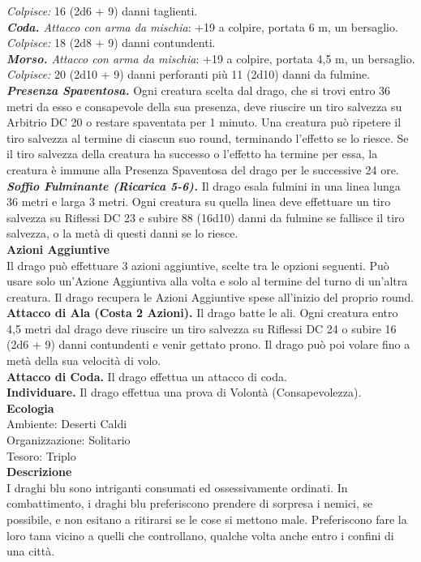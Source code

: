 \begin{multicols}{2}
\emph{Colpisce:} 16 (2d6 + 9) danni taglienti.\\
\emph{\textbf{Coda.} Attacco con arma da mischia}: +19 a colpire, portata 6 m, un bersaglio.\\
\emph{Colpisce:} 18 (2d8 + 9) danni contundenti.\\
\emph{\textbf{Morso.} Attacco con arma da mischia}: +19 a colpire, portata 4,5 m, un bersaglio.\\
\emph{Colpisce:} 20 (2d10 + 9) danni perforanti più 11 (2d10) danni da fulmine.\\
\emph{\textbf{Presenza Spaventosa.}} Ogni creatura scelta dal drago, che si trovi entro 36 metri da esso e consapevole della sua presenza, deve riuscire un tiro salvezza su Arbitrio DC 20 o restare spaventata per 1 minuto. Una creatura può ripetere il tiro salvezza al termine di ciascun suo round, terminando l'effetto se lo riesce. Se il tiro salvezza della creatura ha successo o l'effetto ha termine per essa, la creatura è immune alla Presenza Spaventosa del drago per le successive 24 ore.\\
\emph{\textbf{Soffio Fulminante (Ricarica 5-6).}} Il drago esala fulmini in una linea lunga 36 metri e larga 3 metri. Ogni creatura su quella linea deve effettuare un tiro salvezza su Riflessi DC 23 e subire 88 (16d10) danni da fulmine se fallisce il tiro salvezza, o la metà di questi danni se lo riesce.\\
\textbf{Azioni Aggiuntive}\\
Il drago può effettuare 3 azioni aggiuntive, scelte tra le opzioni seguenti. Può usare solo un'Azione Aggiuntiva alla volta e solo al termine del turno di un'altra creatura. Il drago recupera le Azioni Aggiuntive spese all'inizio del proprio round.\\
\textbf{Attacco di Ala (Costa 2 Azioni).} Il drago batte le ali. Ogni creatura entro 4,5 metri dal drago deve riuscire un tiro salvezza su Riflessi DC 24 o subire 16 (2d6 + 9) danni contundenti e venir gettato prono. Il drago può poi volare fino a metà della sua velocità di volo.\\
\textbf{Attacco di Coda.} Il drago effettua un attacco di coda.\\
\textbf{Individuare.} Il drago effettua una prova di Volontà (Consapevolezza).\\
\textbf{Ecologia}\\
Ambiente: Deserti Caldi\\
Organizzazione: Solitario\\
Tesoro: Triplo\\
\textbf{Descrizione}\\
I draghi blu sono intriganti consumati ed ossessivamente ordinati. In combattimento, i draghi blu preferiscono prendere di sorpresa i nemici, se possibile, e non esitano a ritirarsi se le cose si mettono male. Preferiscono fare la loro tana vicino a quelli che controllano, qualche volta anche entro i confini di una città.\\


\end{multicols}
